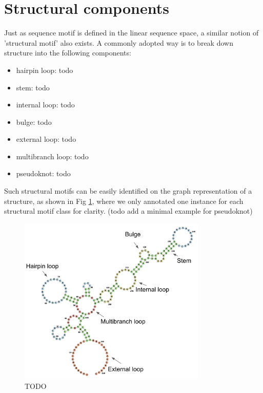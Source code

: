 \documentclass[12pt]{article}
\begin{document}
\section{Structural components}


Just as sequence motif is defined in the linear sequence space,
a similar notion of 'structural motif' also exists.
A commonly adopted way is to break down structure into the following components:

\begin{itemize}
    \item hairpin loop: todo
    \item stem: todo
    \item internal loop: todo
    \item bulge: todo
    \item external loop: todo
    \item multibranch loop: todo
    \item pseudoknot: todo
\end{itemize}

Such structural motifs can be easily identified on the graph representation of a structure,
as shown in Fig \ref{fig:structural_motif_graph}, where we only annotated one instance for
each structural motif class for clarity.
(todo add a minimal example for pseudoknot)

\begin{figure}[h]
    \centering
    \includegraphics[width=0.8\textwidth]{plot/structural_motif_graph.png}
    \caption{TODO}
    \label{fig:structural_motif_graph}
    \centering
\end{figure}
\end{document}
